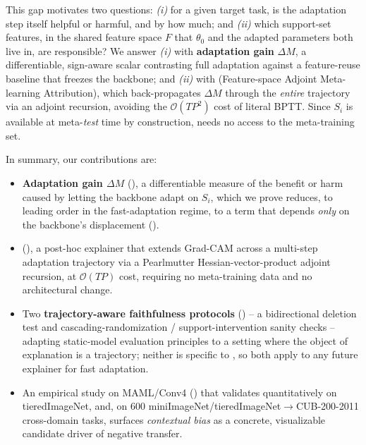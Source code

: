 This gap motivates two questions: \emph{(i)} for a given target task, is the adaptation step itself helpful or harmful, and by how much; and \emph{(ii)} which support-set features, in the shared feature space $F$ that $\theta_0$ and the adapted parameters both live in, are responsible? We answer \emph{(i)} with \textbf{adaptation gain} $\Delta M$, a differentiable, sign-aware scalar contrasting full adaptation against a feature-reuse baseline that freezes the backbone; and \emph{(ii)} with \textbf{\fama} (Feature-space Adjoint Meta-learning Attribution), which back-propagates $\Delta M$ through the \emph{entire} trajectory via an adjoint recursion, avoiding the $\mathcal{O}(TP^2)$ cost of literal BPTT. Since $S_i$ is available at meta-\emph{test} time by construction, \fama needs no access to the meta-training set.

In summary, our contributions are:
\begin{itemize}[leftmargin=*,itemsep=1pt,topsep=2pt]
    \item \textbf{Adaptation gain $\Delta M$} (), a differentiable measure of the benefit or harm caused by letting the backbone adapt on $S_i$, which we prove reduces, to leading order in the fast-adaptation regime, to a term that depends \emph{only} on the backbone's displacement ().
    \item \textbf{\fama} (), a post-hoc explainer that extends Grad-CAM across a multi-step adaptation trajectory via a Pearlmutter Hessian-vector-product adjoint recursion, at $\mathcal{O}(TP)$ cost, requiring no meta-training data and no architectural change.
    \item Two \textbf{trajectory-aware faithfulness protocols} () -- a bidirectional deletion test and cascading-randomization / support-intervention sanity checks -- adapting static-model evaluation principles \citep{samek2016evaluating,petsiuk2018rise,adebayo2018sanity} to a setting where the object of explanation is a trajectory; neither is specific to \fama, so both apply to any future explainer for fast adaptation.
    \item An empirical study on MAML/Conv4 () that validates \fama quantitatively on tieredImageNet, and, on 600 miniImageNet/tieredImageNet$\to$CUB-200-2011 cross-domain tasks, surfaces \emph{contextual bias} as a concrete, visualizable candidate driver of negative transfer.
\end{itemize}
